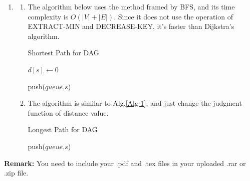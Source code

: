 \documentclass[12pt,a4paper]{article}
\makeatletter
\newtheorem*{solution}{Solution}
\theoremstyle{definition}
\renewenvironment{solution}[1][Solution] {\par\pushQED{\qed}\normalfont\topsep6\p@\@plus6\p@\relax\trivlist\item[\hskip\labelsep\bfseries#1\@addpunct{.}]\ignorespaces}{\popQED\endtrivlist\@endpefalse} \makeatother
\makeatother
\begin{document}
\begin{enumerate}
    \begin{solution}
        \begin{enumerate}
            \item The algorithm below uses the method framed by BFS, and its time complexity is $ O(|V|+|E|) $. Since it does not use the operation of EXTRACT-MIN and DECREASE-KEY, it's faster than Dijkstra's algorithm.\\
            \begin{minipage}[t]{0.89\textwidth}
				\begin{algorithm}[H]
					\BlankLine
					\caption{Shortest Path for DAG}
					\label{Alg-1}
					
					
					$ d[s]\leftarrow0 $\;
					
					 push($ queue $,$ s $)\;
					
			
					\;
				\end{algorithm}
			\end{minipage}
		
			\item The algorithm is similar to Alg.\ref{Alg-1}, and just change the judgment function of distance value.\\
			\begin{minipage}[t]{0.89\textwidth}
				\begin{algorithm}[H]
					\BlankLine
					\caption{Longest Path for DAG}
					\label{Alg-2}
					
					
					push($ queue $,$ s $)\;
					
					
					\;
				\end{algorithm}
			\end{minipage}
        \end{enumerate}
    \end{solution}
    
\end{enumerate}

\vspace{20pt}

\textbf{Remark:} You need to include your .pdf and .tex files in your uploaded .rar or .zip file.

\end{document}
